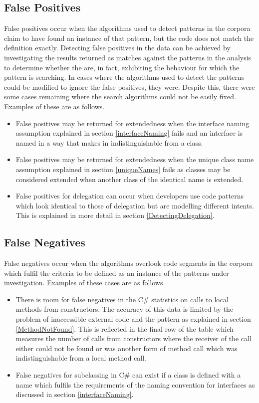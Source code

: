 \subsection{False Positives}
\label{falsePositives}
False positives occur when the algorithms used to detect patterns in the corpora claim to have found an instance of that pattern, but the code does not match the definition exactly. Detecting false positives in the data can be achieved by investigating the results returned as matches against the patterns in the analysis to determine whether the are, in fact, exhibiting the behaviour for which the pattern is searching. In cases where the algorithms used to detect the patterns could be modified to ignore the false positives, they were. Despite this, there were some cases remaining where the search algorithms could not be easily fixed. Examples of these are as follows.
\begin{itemize}
	\item False positives may be returned for extendedness when the interface naming assumption explained in section \ref{interfaceNaming} fails and an interface is named in a way that makes in indistinguishable from a class.
	\item False positives may be returned for extendedness when the unique class name assumption explained in section \ref{uniqueNames} fails as classes may be considered extended when another class of the identical name is extended.
	\item False positives for delegation can occur when developers use code patterns which look identical to those of delegation but are modelling different intents. This is explained in more detail in section \ref{DetectingDelegation}.
	\newline
\end{itemize} 

\subsection{False Negatives}
False negatives occur when the algorithms overlook code segments in the corpora which fulfil the criteria to be defined as an instance of the patterns under investigation. Examples of these cases are as follows.
\begin{itemize}
	\item There is room for false negatives in the C\# statistics on calls to local methods from constructors. The accuracy of this data is limited by the problem of inaccessible external code and the  pattern as explained in section \ref{MethodNotFound}. This is reflected in the final row of the table which measures the number of calls from constructors where the receiver of the call either could not be found or was another form of method call which was indistinguishable from a local method call.
	\item False negatives for subclassing in C\# can exist if a class is defined with a name which fulfils the requirements of the naming convention for interfaces as discussed in section \ref{interfaceNaming}.
\end{itemize}





